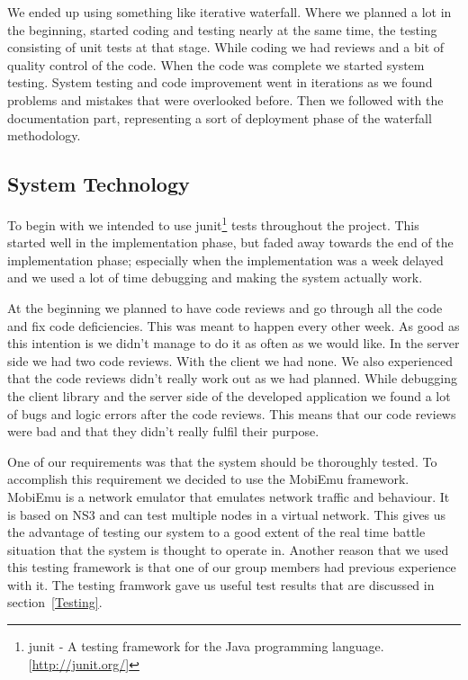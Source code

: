     We ended up using something like iterative waterfall. Where we planned a lot in the beginning, started coding and testing nearly at the same time, the testing consisting of unit tests at that stage. While coding we had reviews and a bit of quality control of the code. When the code was complete we started system testing. System testing and code improvement went in iterations as we found problems and mistakes that were overlooked before. Then we followed with the documentation part, representing a sort of deployment phase of the waterfall methodology. 

    \subsection{System Technology}\label{System Technology}
    
    To begin with we intended to use \gls{junit}\footnote{\gls{junit} - A testing framework for the Java programming language. [\url{http://junit.org/}]} tests throughout the project. This started well in the implementation phase, but faded away towards the end of the implementation phase; especially when the implementation was a week delayed and we used a lot of time debugging and making the system actually work. 
    
    At the beginning we planned to have code reviews and go through all the code and fix code deficiencies. This was meant to happen every other week. As good as this intention is we didn't manage to do it as often as we would like. In the server side we had two code reviews. With the client we had none. We also experienced that the code reviews didn't really work out as we had planned. While debugging the client library and the server side of the developed application we found a lot of bugs and logic errors after the code reviews. This means that our code reviews were bad and that they didn't really fulfil their purpose. 
    
    One of our requirements was that the system should be thoroughly tested. To accomplish this requirement we decided to use the MobiEmu framework. MobiEmu is a network emulator that emulates network traffic and behaviour. It is based on NS3 and can test multiple nodes in a virtual network. This gives us the advantage of testing our system to a good extent of the real time battle situation that the system is thought to operate in. Another reason that we used this testing framework is that one of our group members had previous experience with it. The testing framwork gave us useful test results that are discussed in section~\ref{Testing}.

